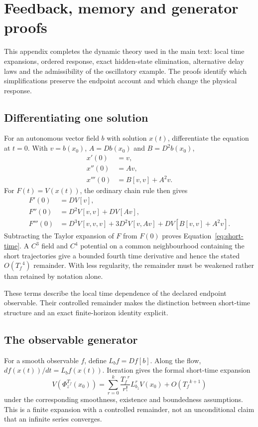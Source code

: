 \chapter{Feedback, memory and generator proofs}\label{app:generators}

This appendix completes the dynamic theory used in the main text: local time expansions, ordered response, exact hidden-state elimination, alternative delay laws and the admissibility of the oscillatory example. The proofs identify which simplifications preserve the endpoint account and which change the physical response.


\section{Differentiating one solution}
For an autonomous vector field $b$ with solution $x(t)$, differentiate the equation at $t=0$. With $v=b(x_0)$, $A=Db(x_0)$ and $B=D^2b(x_0)$,
\begin{align}
 x'(0)&=v,\\
 x''(0)&=Av,\\
 x'''(0)&=B[v,v]+A^2v.
\end{align}
For $F(t)=V(x(t))$, the ordinary chain rule then gives
\begin{align}
 F'(0)&=DV[v],\\
 F''(0)&=D^2V[v,v]+DV[Av],\\
 F'''(0)&=D^3V[v,v,v]+3D^2V[v,Av]
             +DV[B[v,v]+A^2v].
\end{align}
Subtracting the Taylor expansion of $F$ from $F(0)$ proves Equation~\ref{eq:short-time}. A $C^3$ field and $C^4$ potential on a common neighbourhood containing the short trajectories give a bounded fourth time derivative and hence the stated $O({T_f}^4)$ remainder. With less regularity, the remainder must be weakened rather than retained by notation alone.

These terms describe the local time dependence of the declared endpoint observable. Their controlled remainder makes the distinction between short-time structure and an exact finite-horizon identity explicit.

\section{The observable generator}
For a smooth observable $f$, define $L_bf=Df[b]$. Along the flow, $d f(x(t))/dt=L_bf(x(t))$. Iteration gives the formal short-time expansion
\begin{equation}
 V(\Phi_z^{T_f}(x_0))
 =\sum_{r=0}^{k}\frac{{T_f}^r}{r!}L_{b_z}^{r}V(x_0)
 +O({T_f}^{k+1})
\end{equation}
under the corresponding smoothness, existence and boundedness assumptions. This is a finite expansion with a controlled remainder, not an unconditional claim that an infinite series converges.

